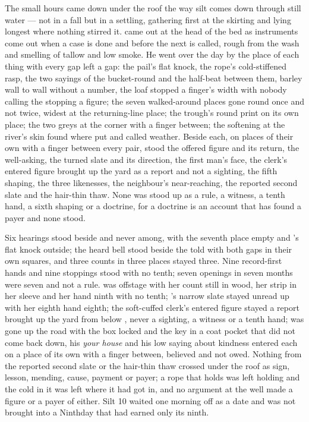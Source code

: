 The small hours came down under the roof the way silt comes down through still water --- not in a fall but in a settling, gathering first at the skirting and lying longest where nothing stirred it.  came out at the head of the bed as instruments come out when a case is done and before the next is called, rough from the wash and smelling of tallow and low smoke. He went over the day by the place of each thing with every gap left a gap: the pail's flat knock, the rope's cold-stiffened rasp, the two sayings of the bucket-round and the half-beat between them, barley wall to wall without a number, the loaf stopped a finger's width with nobody calling the stopping a figure; the seven walked-around places gone round once and not twice, widest at the returning-line place; the trough's round print on its own place; the two greys at the corner with a finger between; the softening at the river's skin found where put and called weather. Beside each, on places of their own with a finger between every pair, stood the offered figure and its return, the well-asking, the turned slate and its direction, the first man's face, the clerk's entered figure brought up the yard as a report and not a sighting, the fifth shaping, the three likenesses, the neighbour's near-reaching, the reported second slate and the hair-thin thaw. None was stood up as a rule, a witness, a tenth hand, a sixth shaping or a doctrine, for a doctrine is an account that has found a payer and none stood.

Six hearings stood beside and never among, with the seventh place empty and 's flat knock outside; the heard bell stood beside the told with both gaps in their own squares, and three counts in three places stayed three. Nine record-first hands and nine stoppings stood with no tenth; seven openings in seven months were seven and not a rule.  was offstage with her count still in wood, her strip in her sleeve and her hand ninth with no tenth; 's narrow slate stayed unread up  with her eighth hand eighth; the soft-cuffed clerk's entered figure stayed a report brought up the yard from  below , never a sighting, a witness or a tenth hand;  was gone up the road with the box locked and the key in a coat pocket that did not come back down, his \emph{your house} and his low saying about kindness entered each on a place of its own with a finger between, believed and not owed. Nothing from the reported second slate or the hair-thin thaw crossed under the roof as sign, lesson, mending, cause, payment or payer; a rope that holds was left holding and the cold in it was left where it had got in, and no argument at the well made a figure or a payer of either. Silt 10 waited one morning off as a date and was not brought into a Ninthday that had earned only its ninth.

